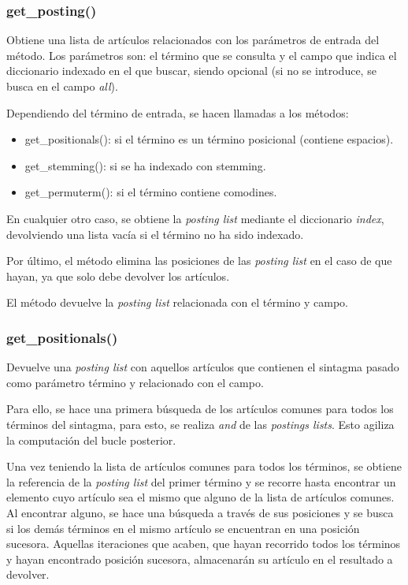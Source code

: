 \documentclass[12pt,a4paper]{article}
\begin{document}
\subsubsection{get\_posting()}
Obtiene una lista de artículos relacionados con los parámetros de entrada del método.
Los parámetros son: el término que se consulta y el campo que indica el diccionario indexado en el que buscar, siendo opcional (si no se introduce, se busca en el campo \textit{all}).

Dependiendo del término de entrada, se hacen llamadas a los métodos:
\begin{itemize}
    \item get\_positionals(): si el término es un término posicional (contiene espacios).
    \item get\_stemming(): si se ha indexado con stemming.
    \item get\_permuterm(): si el término contiene comodines.
\end{itemize}

En cualquier otro caso, se obtiene la \textit{posting list} mediante el diccionario \textit{index}, devolviendo una lista vacía si el término no ha sido indexado.

Por último, el método elimina las posiciones de las \textit{posting list} en el caso de que hayan, ya que solo debe devolver los artículos.

El método devuelve la \textit{posting list} relacionada con el término y campo.

\subsubsection{get\_positionals()}
Devuelve una \textit{posting list} con aquellos artículos que contienen el sintagma pasado como parámetro término y relacionado con el campo.

Para ello, se hace una primera búsqueda de los artículos comunes para todos los términos del sintagma, para esto, se realiza \textit{and} de las \textit{postings lists}. Esto agiliza la computación del bucle posterior.

Una vez teniendo la lista de artículos comunes para todos los términos, se obtiene la referencia de la \textit{posting list} del primer término y se recorre hasta encontrar un elemento cuyo artículo sea el mismo que alguno de la lista de artículos comunes. Al encontrar alguno, se hace una búsqueda a través de sus posiciones y se busca si los demás términos en el mismo artículo se encuentran en una posición sucesora. Aquellas iteraciones que acaben, que hayan recorrido todos los términos y hayan encontrado posición sucesora, almacenarán su artículo en el resultado a devolver.
\end{document}
